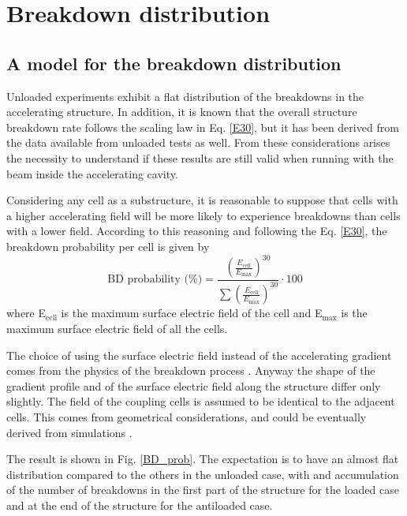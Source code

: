 \section[Breakdown distribution]{Breakdown distribution}

\subsection[A model for the breakdown distribution]{A model for the breakdown distribution}

Unloaded experiments exhibit a flat distribution of the breakdowns in the accelerating structure. In addition, it is known that the overall structure breakdown rate follows the scaling law in Eq. \ref{E30}, but it has been derived from the data available from unloaded tests as well. From these considerations arises the necessity to understand if these results are still valid when running with the beam inside the accelerating cavity.

Considering any cell as a substructure, it is reasonable to suppose that cells with a higher accelerating field will be more likely to experience breakdowns than cells with a lower field. According to this reasoning and following the Eq. \ref{E30}, the breakdown probability per cell is given by
\begin{equation}
\text{BD probability (\%)} =\frac{   \left ( \frac{E_\text{cell}}{E_\text{max}} \right )^{30} }{ \sum \left( \frac{E_\text{cell}}{E_\text{max}} \right )^{30}   } \cdot 100
\end{equation}
where E$_\text{cell}$ is the maximum surface electric field of the cell and E$_\text{max}$ is the maximum surface electric field of all the cells. 

The choice of using the surface electric field instead of the accelerating gradient comes from the physics of the breakdown process \cite{Walter:PC}. Anyway the shape of the gradient profile and of the surface electric field along the structure differ only slightly. The field of the coupling cells is assumed to be identical to the adjacent cells. This comes from geometrical considerations, and could be eventually derived from simulations \cite{Alexej:PC}.

The result is shown in Fig. \ref{BD_prob}. The expectation is to have an almost flat distribution compared to the others in the unloaded case, with and accumulation of the number of breakdowns in the first part of the structure for the loaded case and at the end of the structure for the antiloaded case.


